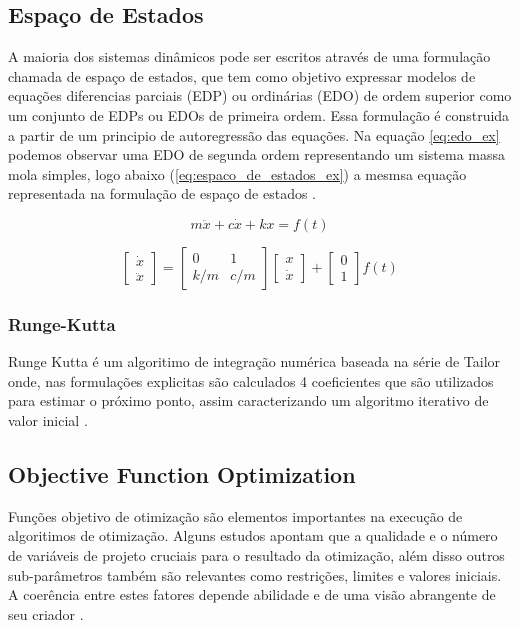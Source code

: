 \subsection{Espaço de Estados}

A maioria dos sistemas dinâmicos pode ser escritos através de uma formulação
chamada de espaço de estados, que tem como objetivo expressar modelos 
de equações diferencias parciais (EDP) ou ordinárias (EDO) de ordem superior
como um conjunto de EDPs ou EDOs de primeira ordem.
Essa formulação é construida a partir de um principio de autoregressão
das equações. Na equação \ref{eq:edo_ex} podemos observar uma EDO de segunda ordem representando
um sistema massa mola simples,
logo abaixo (\ref{eq:espaco_de_estados_ex}) a mesmsa equação representada na formulação
de espaço de estados \cite{hamilton94}.

\begin{equation}
    \label{eq:edo_ex}
    m \ddot x+c \dot x+kx = f(t)
\end{equation}

\begin{equation}
    \label{eq:espaco_de_estados_ex}
    \begin{bmatrix}
        \dot x \\
        \ddot x
    \end{bmatrix}
    =
    \begin{bmatrix}
        0 & 1 \\
        k/m & c/m
    \end{bmatrix}
    \begin{bmatrix}
        x \\
        \dot x
    \end{bmatrix}
    +
    \begin{bmatrix}
        0 \\
        1
    \end{bmatrix}
    f(t)
\end{equation}

\subsubsection{Runge-Kutta}
Runge Kutta é um algoritimo de integração numérica baseada na série de Tailor onde,
nas formulações explicitas são calculados 4 coeficientes que são utilizados para estimar
o próximo ponto, assim caracterizando um algoritmo iterativo de valor inicial \cite{bettis79,dormand80}.

\subsection{Objective Function Optimization}
Funções objetivo de otimização são elementos importantes na execução de algoritimos
de otimização. Alguns estudos apontam que a qualidade e o número de variáveis de
projeto cruciais para o resultado da otimização, além disso outros sub-parâmetros
também são relevantes como restrições, limites e valores iniciais. A coerência entre
estes fatores depende abilidade e de uma visão abrangente de seu criador \cite{albaghdadi21}.

